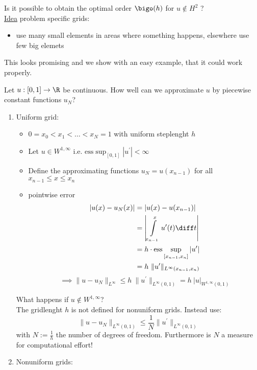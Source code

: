 Is it possible to obtain the optimal order $\bigo(h)$ for $u \not \in H^2$ ?\\
\underline{Idea} problem specific grids:
\begin{itemize}
	\item use many small elements in areas where something \glqq happens\grqq, elsewhere use few big elemets
\end{itemize}
This looks promising and we show with an easy example, that it could work properly.
\begin{example}
	Let $u: [0,1] \to \R $ be continuous. How well can we approximate $u$ by piecewise constant functions $u_{N}$?
	\begin{enumerate}[label = \Roman*)]
		\item Uniform grid:
			\begin{itemize}
				\item $0 = x_{0} < x_{1}< \dots < x_{N} = 1$ with uniform steplenght $h$
				\item Let $u \in W^{1,\infty}$ i.e. $\text{ess}\sup_{[0,1]} | u^\prime|< \infty$
				\item Define the approximating functions $u_{N}=u(x_{n-1})$ for all $x_{n-1}\leq x \leq x_{n}$
				\item pointwise error
					\begin{align*}
						|u(x) - u_{N}(x) | &= | u(x) - u(x_{n-1})|\\
										   &= \left| \int\limits_{x_{n-1}}^{x} u^\prime(t) \diff t \right|\\
										   &= h\cdot \text{ess}\sup_{[x_{n-1},x_{n}]}|u^\prime | \\
										   &= h\ \|u^\prime\|_{L^\infty(x_{n-1},x_{n})}
					\end{align*}
					\begin{equation*}
						\implies\|u -u_{N}\|_{L^\infty} \leq h \ \|u^\prime\|_{L^\infty(0,1)}= h \ |u|_{W^{1,\infty}(0,1)}
				\end{equation*}
			\end{itemize}
			What happens if $u \not \in W^{1,\infty}$?\\
			The gridlenght $h$ is not defined for nonuniform grids. Instead use:
			\begin{equation*}
				\|u-u_{N}\|_{L^{\infty}(0,1)}  \leq \frac{1}{N} \|u^\prime\|_{L^\infty(0,1)}
			\end{equation*}
			with $N := \frac{1}{h}$ the number of degrees of freedom. Furthermore is $N$ a measure for computational effort!
		\item Nonuniform grids:\\

\end{enumerate}
\end{example}
